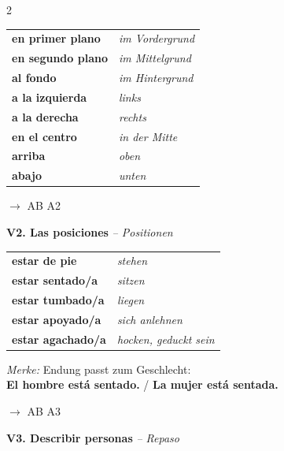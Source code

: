 \documentclass[10pt, a4paper]{article}
\newcommand{\seriftext}[1]{{\fontfamily{ppl}\selectfont #1}}
\newcommand{\es}[1]{\seriftext{\textbf{#1}}}
\newcommand{\de}[1]{\textit{\textcolor{akzent}{#1}}}
\newcommand{\abmark}[1]{{\footnotesize\textcolor{akzent}{$\rightarrow$ AB #1}}}
\newcommand{\abschnitt}[2]{\noindent\textbf{\large #1. #2}}
\begin{document}
\begin{multicols}{2}
\begin{vokabelbox}
{\small
\begin{tabular}{@{}ll@{}}
\es{en primer plano} & \de{im Vordergrund} \\
\es{en segundo plano} & \de{im Mittelgrund} \\
\es{al fondo} & \de{im Hintergrund} \\
\es{a la izquierda} & \de{links} \\
\es{a la derecha} & \de{rechts} \\
\es{en el centro} & \de{in der Mitte} \\
\es{arriba} & \de{oben} \\
\es{abajo} & \de{unten} \\
\end{tabular}}
\end{vokabelbox}

\abmark{A2}

\vspace{6pt}

\abschnitt{V2}{Las posiciones} \de{-- Positionen}

\vspace{3pt}

\begin{vokabelbox}
{\small
\begin{tabular}{@{}ll@{}}
\es{estar de pie} & \de{stehen} \\
\es{estar sentado/a} & \de{sitzen} \\
\es{estar tumbado/a} & \de{liegen} \\
\es{estar apoyado/a} & \de{sich anlehnen} \\
\es{estar agachado/a} & \de{hocken, geduckt sein} \\
\end{tabular}}
\end{vokabelbox}

\begin{tippbox}
\footnotesize\textit{Merke:} Endung passt zum Geschlecht:\\
\es{El hombre está sentado.} / \es{La mujer está sentada.}
\end{tippbox}

\abmark{A3}

\columnbreak

\abschnitt{V3}{Describir personas} \de{-- Repaso}


\end{multicols}
\end{document}
